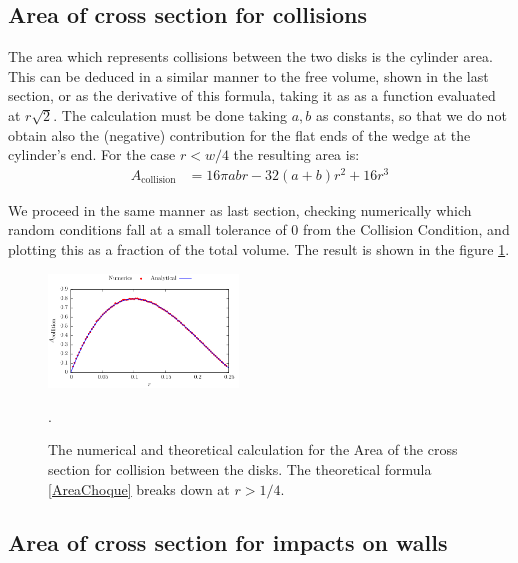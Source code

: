 \documentclass[letterpaper,10pt, jcp, aps]{revtex4-1}
\begin{document}
\subsection{Area of cross section for collisions}

The area which represents collisions between the two disks is the cylinder area. 
This can be deduced in a similar manner to the free volume, shown in the last
section, or as the derivative of this formula, taking it as as a function evaluated at 
$r\sqrt{2}$. The calculation must be done taking $a,b$ as constants, so that
we do not obtain also the (negative) contribution for the flat ends of
the wedge at the cylinder's end. For the case $r<w/4$ the resulting area is:
\begin{align}\label{AreaChoque}
A_\text{collision} & =  
16\pi a b r -32 (a+b)r^2 +16 r^3 
\end{align}

We proceed in the same manner as last section, checking numerically which
random
conditions fall at a small tolerance of $0$ from the Collision Condition, and
plotting this as a fraction of the total volume. The result is shown in the
figure \ref{AreaChoqueTeoyNum}. 
\begin{figure}
\centering
\includegraphics[width=0.45\textwidth]{./FigurasPerfectas/AreaCol02.pdf}
\caption{The numerical and theoretical calculation for the Area of the cross section
for collision between the disks.  The theoretical formula 
\ref{AreaChoque} breaks down at
$r>1/4$.}
\label{AreaChoqueTeoyNum}.
\end{figure}


\subsection{Area of cross section for  impacts on walls}
\end{document}
